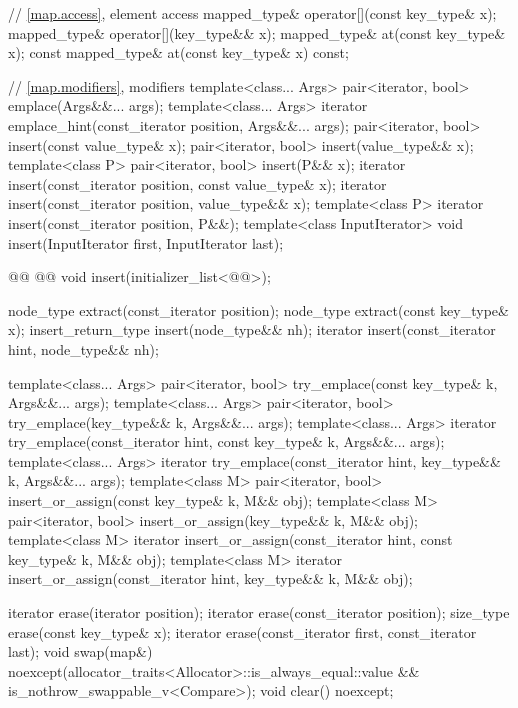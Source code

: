 \documentclass{wg21}
\begin{document}
\begin{codeblock}
{{        // \ref{map.access}, element access
        mapped_type& operator[](const key_type& x);
        mapped_type& operator[](key_type&& x);
        mapped_type&       at(const key_type& x);
        const mapped_type& at(const key_type& x) const;

        // \ref{map.modifiers}, modifiers
        template<class... Args> pair<iterator, bool> emplace(Args&&... args);
        template<class... Args> iterator emplace_hint(const_iterator position, Args&&... args);
        pair<iterator, bool> insert(const value_type& x);
        pair<iterator, bool> insert(value_type&& x);
        template<class P> pair<iterator, bool> insert(P&& x);
        iterator insert(const_iterator position, const value_type& x);
        iterator insert(const_iterator position, value_type&& x);
        template<class P>
        iterator insert(const_iterator position, P&&);
        template<class InputIterator>
        void insert(InputIterator first, InputIterator last);
        
        @@
        @@
        void insert(initializer_list<@@>);

        node_type extract(const_iterator position);
        node_type extract(const key_type& x);
        insert_return_type insert(node_type&& nh);
        iterator           insert(const_iterator hint, node_type&& nh);

        template<class... Args>
        pair<iterator, bool> try_emplace(const key_type& k, Args&&... args);
        template<class... Args>
        pair<iterator, bool> try_emplace(key_type&& k, Args&&... args);
        template<class... Args>
        iterator try_emplace(const_iterator hint, const key_type& k, Args&&... args);
        template<class... Args>
        iterator try_emplace(const_iterator hint, key_type&& k, Args&&... args);
        template<class M>
        pair<iterator, bool> insert_or_assign(const key_type& k, M&& obj);
        template<class M>
        pair<iterator, bool> insert_or_assign(key_type&& k, M&& obj);
        template<class M>
        iterator insert_or_assign(const_iterator hint, const key_type& k, M&& obj);
        template<class M>
        iterator insert_or_assign(const_iterator hint, key_type&& k, M&& obj);

        iterator  erase(iterator position);
        iterator  erase(const_iterator position);
        size_type erase(const key_type& x);
        iterator  erase(const_iterator first, const_iterator last);
        void      swap(map&)
        noexcept(allocator_traits<Allocator>::is_always_equal::value &&
        is_nothrow_swappable_v<Compare>);
        void      clear() noexcept;

}}
\end{codeblock}
\end{document}
